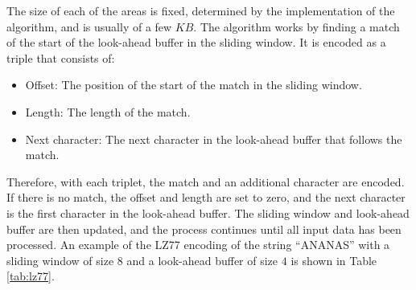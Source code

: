The size of each of the areas is fixed, determined by the implementation of the algorithm, and is usually of a few $\unit{KB}$. The algorithm works by finding a match of the start of the look-ahead buffer in the sliding window. It is encoded as a triple that consists of:
\begin{itemize}
    \item Offset: The position of the start of the match in the sliding window.
    \item Length: The length of the match.
    \item Next character: The next character in the look-ahead buffer that follows the match.
\end{itemize}

Therefore, with each triplet, the match and an additional character are encoded. If there is no match, the offset and length are set to zero, and the next character is the first character in the look-ahead buffer. The sliding window and look-ahead buffer are then updated, and the process continues until all input data has been processed. An example of the LZ77 encoding of the string ``ANANAS'' with a sliding window of size $8$ and a look-ahead buffer of size $4$ is shown in Table \ref{tab:lz77}.


